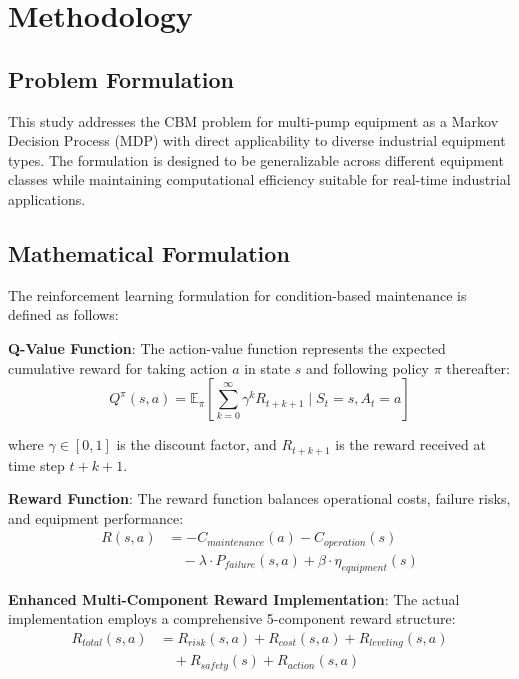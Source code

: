 \documentclass[twocolumn]{article}
\begin{document}
\section{Methodology}

\subsection{Problem Formulation}

This study addresses the CBM problem for multi-pump equipment as a Markov Decision Process (MDP) with direct applicability to diverse industrial equipment types. The formulation is designed to be generalizable across different equipment classes while maintaining computational efficiency suitable for real-time industrial applications.

\subsection{Mathematical Formulation}

The reinforcement learning formulation for condition-based maintenance is defined as follows:

\textbf{Q-Value Function}: The action-value function represents the expected cumulative reward for taking action $a$ in state $s$ and following policy $\pi$ thereafter:
\begin{equation}
Q^\pi(s,a) = \mathbb{E}_\pi\left[\sum_{k=0}^{\infty} \gamma^k R_{t+k+1} \mid S_t = s, A_t = a\right]
\end{equation}

where $\gamma \in [0,1]$ is the discount factor, and $R_{t+k+1}$ is the reward received at time step $t+k+1$.

\textbf{Reward Function}: The reward function balances operational costs, failure risks, and equipment performance:
\begin{equation}
\begin{split}
R(s,a) &= -C_{maintenance}(a) - C_{operation}(s) \\
&\quad - \lambda \cdot P_{failure}(s,a) + \beta \cdot \eta_{equipment}(s)
\end{split}
\end{equation}

\textbf{Enhanced Multi-Component Reward Implementation}: The actual implementation employs a comprehensive 5-component reward structure:
\begin{equation}
\begin{split}
R_{total}(s,a) &= R_{risk}(s,a) + R_{cost}(s,a) + R_{leveling}(s,a) \\
&\quad + R_{safety}(s) + R_{action}(s,a)
\end{split}
\end{equation}
\end{document}
